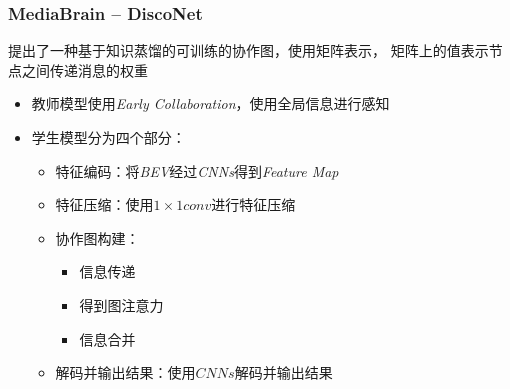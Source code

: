 \documentclass[8]{beamer}
\begin{document}
\begin{frame}
    \frametitle{MediaBrain -- DiscoNet\cite{li2021learning}}
        \cite{li2021learning}提出了一种基于知识蒸馏\cite{hinton2015distilling}的可训练的协作图，使用矩阵表示，
        矩阵上的值表示节点之间传递消息的权重
        \bigskip
        \begin{itemize}
            \item 教师模型使用\textit{Early Collaboration}，使用全局信息进行感知
            \item 学生模型分为四个部分：
            \begin{itemize}
                \item 特征编码：将\textit{BEV}经过\textit{CNNs}得到\textit{Feature Map}
                \item 特征压缩：使用$1\times 1 conv$进行特征压缩
                \item 协作图构建：
                \begin{itemize}
                    \item 信息传递
                    \item 得到图注意力
                    \item 信息合并
                \end{itemize}
                \item 解码并输出结果：使用$CNNs$解码并输出结果
            \end{itemize}
        \end{itemize}
\end{frame}
\end{document}
